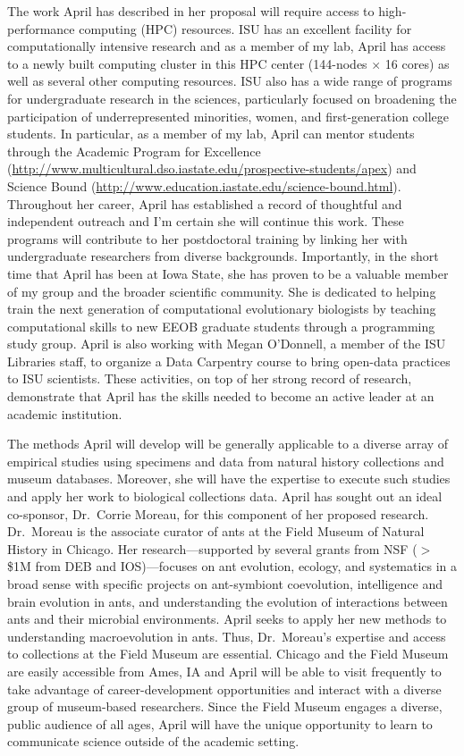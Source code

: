 \documentclass[11pt]{article}
\begin{document}
The work April has described in her proposal will require access to high-performance computing (HPC) resources.
ISU has an excellent facility for computationally intensive research and as a member of my lab, April has access to a newly built computing cluster in this HPC center (144-nodes $\times$ 16 cores) as well as several other computing resources.
ISU also has a wide range of programs for undergraduate research in the sciences, particularly focused on broadening the participation of underrepresented minorities, women, and first-generation college students. 
In particular, as a member of my lab, April can mentor students through the Academic Program for Excellence (\href{http://www.multicultural.dso.iastate.edu/prospective-students/apex}{http://www.multicultural.dso.iastate.edu/prospective-students/apex}) and Science Bound (\href{http://www.education.iastate.edu/science-bound.html}{http://www.education.iastate.edu/science-bound.html}).
Throughout her career, April has established a record of thoughtful and independent outreach and I'm certain she will continue this work.
These programs will contribute to her postdoctoral training by linking her with undergraduate researchers from diverse backgrounds. 
Importantly, in the short time that April has been at Iowa State, she has proven to be a valuable member of my group and the broader scientific community.
She is dedicated to helping train the next generation of computational evolutionary biologists by teaching computational skills to new EEOB graduate students through a programming study group.
April is also working with Megan O'Donnell, a member of the ISU Libraries staff, to organize a Data Carpentry course to bring open-data practices to ISU scientists.
These activities, on top of her strong record of research, demonstrate that April has the skills needed to become an active leader at an academic institution. 

The methods April will develop will be generally applicable to a diverse array of empirical studies using specimens and data from natural history collections and museum databases.
Moreover, she will have the expertise to execute such studies and apply her work to biological collections data.
April has sought out an ideal co-sponsor, Dr.~Corrie Moreau, for this component of her proposed research. 
Dr.~Moreau is the associate curator of ants at the Field Museum of Natural History in Chicago. 
Her research---supported by several grants from NSF ($>$\$1M from DEB and IOS)---focuses on ant evolution, ecology, and systematics in a broad sense with specific projects on ant-symbiont coevolution, intelligence and brain evolution in ants, and understanding the evolution of interactions between ants and their microbial environments. 
April seeks to apply her new methods to understanding macroevolution in ants.
Thus, Dr.~Moreau's expertise and access to collections at the Field Museum are essential.
Chicago and the Field Museum are easily accessible from Ames, IA and April will be able to visit frequently to take advantage of career-development opportunities and interact with a diverse group of museum-based researchers.
Since the Field Museum engages a diverse, public audience of all ages, April will have the unique opportunity to learn to communicate science outside of the academic setting.
\end{document}
